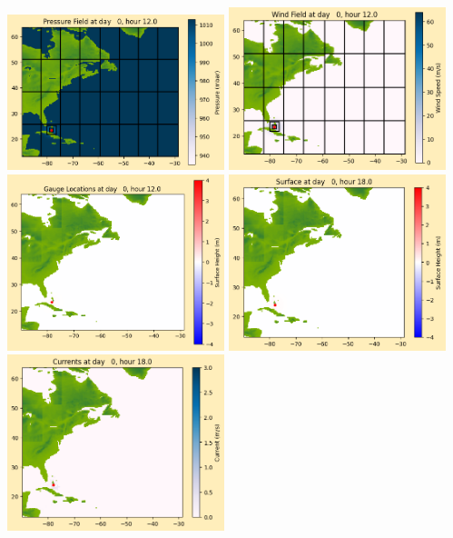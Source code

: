 \documentclass[11pt]{article}
\begin{document}
\includegraphics[width=0.475\textwidth]{frame0014fig1012.png}
\vskip 10pt 
\includegraphics[width=0.475\textwidth]{frame0014fig1013.png}
\includegraphics[width=0.475\textwidth]{frame0014fig1014.png}
\vskip 10pt 
\includegraphics[width=0.475\textwidth]{frame0015fig1001.png}
\includegraphics[width=0.475\textwidth]{frame0015fig1002.png}
\end{document}
